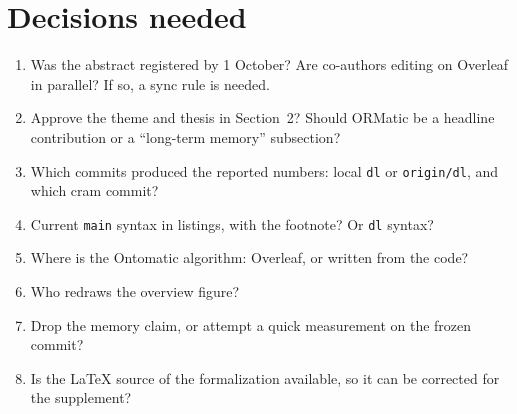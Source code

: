 \documentclass[11pt]{article}
\newcommand{\code}[1]{\texttt{#1}}
\begin{document}
\section{Decisions needed}
\begin{enumerate}[label=\textbf{D\arabic*}]
  \item Was the abstract registered by 1 October? Are co-authors editing on Overleaf in parallel? If so, a sync rule is needed.
  \item Approve the theme and thesis in Section~2? Should ORMatic be a headline contribution or a ``long-term memory'' subsection?
  \item Which commits produced the reported numbers: local \code{dl} or \code{origin/dl}, and which cram commit?
  \item Current \code{main} syntax in listings, with the footnote? Or \code{dl} syntax?
  \item Where is the Ontomatic algorithm: Overleaf, or written from the code?
  \item Who redraws the overview figure?
  \item Drop the memory claim, or attempt a quick measurement on the frozen commit?
  \item Is the LaTeX source of the formalization available, so it can be corrected for the supplement?
\end{enumerate}
\end{document}
